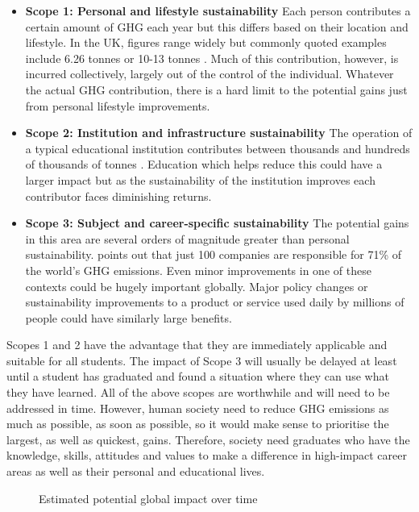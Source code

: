 \begin{itemize}
    \item \textbf{Scope 1: Personal and lifestyle sustainability} Each person contributes a certain amount of GHG each year but this differs based on their location and lifestyle. In the UK, figures range widely but commonly quoted examples include 6.26 tonnes \citep{GlobalChangeDataLab2021} or 10-13 tonnes \citep{Campbell2022}. Much of this contribution, however, is incurred collectively, largely out of the control of the individual. Whatever the actual GHG contribution, there is a hard limit to the potential gains just from personal lifestyle improvements. 
    \item \textbf{Scope 2: Institution and infrastructure sustainability} The operation of a typical educational institution contributes between thousands and hundreds of thousands of tonnes \citep{Helmers2021}. Education which helps reduce this could have a larger impact but as the sustainability of the institution improves each contributor faces diminishing returns.
    \item \textbf{Scope 3: Subject and career-specific sustainability} The potential gains in this area are several orders of magnitude greater than personal sustainability. \citet{Griffin2017} points out that just 100 companies are responsible for 71\% of the world's GHG emissions. Even minor improvements in one of these contexts could be hugely important globally. Major policy changes or sustainability improvements to a product or service used daily by millions of people could have similarly large benefits.
\end{itemize}

Scopes 1 and 2 have the advantage that they are immediately applicable and suitable for all students. The impact of Scope 3 will usually be delayed at least until a student has graduated and found a situation where they can use what they have learned. All of the above scopes are worthwhile and will need to be addressed in time. However, human society need to reduce GHG emissions as much as possible, as soon as possible, so it would make sense to prioritise the largest, as well as quickest, gains. Therefore, society need graduates who have the knowledge, skills, attitudes and values to make a difference in high-impact career areas as well as their personal and educational lives.

\begin{figure}[ht]
\caption{\label{impact-image}Estimated potential global impact over time}
\end{figure}

